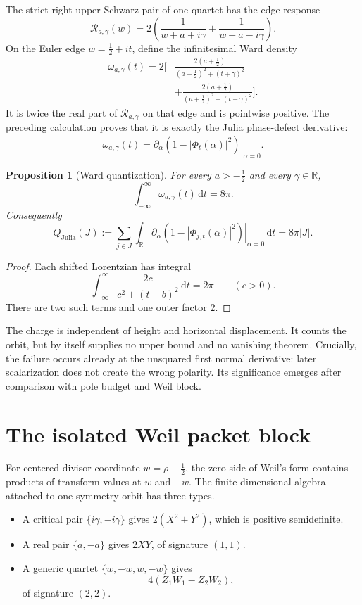 \documentclass[11pt]{article}
\newtheorem{proposition}[theorem]{Proposition}
\newcommand{\R}{\mathbb R}
\newcommand{\dd}{\,\mathrm d}
\begin{document}
The strict-right upper Schwarz pair of one quartet has the edge response
\[
\mathcal R_{a,\gamma}(w)
=2\left(
\frac1{w+a+i\gamma}
+\frac1{w+a-i\gamma}
\right).
\]
On the Euler edge \(w=\frac12+it\), define the infinitesimal Ward density
\[
\begin{aligned}
\omega_{a,\gamma}(t)
=2\bigg[
&\frac{2(a+\frac12)}
 {(a+\frac12)^2+(t+\gamma)^2}\\
&+\frac{2(a+\frac12)}
 {(a+\frac12)^2+(t-\gamma)^2}
\bigg].
\end{aligned}
\]
It is twice the real part of \(\mathcal R_{a,\gamma}\) on that edge and
is pointwise positive.  The preceding calculation proves that it is
exactly the Julia phase-defect derivative:
\[
 \omega_{a,\gamma}(t)
 =\left.\partial_\alpha
   (1-|\Phi_t(\alpha)|^2)\right|_{\alpha=0}.
\]

\begin{proposition}[Ward quantization]
\label{prop:ward}
For every \(a>-\frac12\) and every \(\gamma\in\R\),
\[
 \int_{-\infty}^{\infty}\omega_{a,\gamma}(t)\dd t=8\pi.
\]
Consequently
\[
 Q_{\mathrm{Julia}}(J)
 :=\sum_{j\in J}\int_{\R}
 \left.\partial_\alpha
   (1-|\Phi_{j,t}(\alpha)|^2)\right|_{\alpha=0}\dd t
 =8\pi|J|.
\]
\end{proposition}

\begin{proof}
Each shifted Lorentzian has integral
\[
 \int_{-\infty}^{\infty}
 \frac{2c}{c^2+(t-b)^2}\dd t=2\pi
 \qquad(c>0).
\]
There are two such terms and one outer factor \(2\).
\end{proof}

The charge is independent of height and horizontal displacement.  It
counts the orbit, but by itself supplies no upper bound and no vanishing
theorem.  Crucially, the failure occurs already at the unsquared first
normal derivative: later scalarization does not create the wrong polarity.
Its significance emerges after comparison with pole budget and Weil block.

\section{The isolated Weil packet block}
\label{sec:weil}

For centered divisor coordinate \(w=\rho-\frac12\), the zero side of
Weil's form contains products of transform values at \(w\) and \(-w\).
The finite-dimensional algebra attached to one symmetry orbit has three
types.

\begin{itemize}
\item A critical pair \(\{i\gamma,-i\gamma\}\) gives
      \(2(X^2+Y^2)\), which is positive semidefinite.
\item A real pair \(\{a,-a\}\) gives \(2XY\), of signature \((1,1)\).
\item A generic quartet
      \(\{w,-w,\overline w,-\overline w\}\) gives
      \[
      4(Z_1W_1-Z_2W_2),
      \]
      of signature \((2,2)\).
\end{itemize}
\end{document}

